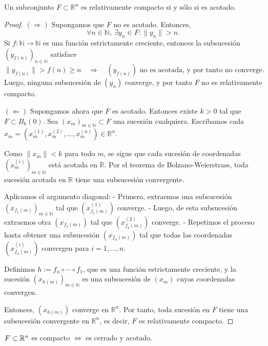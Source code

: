 \clearpage

\begin{prop}
  Un subconjunto \(F \subset \mathbb{R}^n\) es relativamente compacto si y sólo si es acotado.
  \begin{proof}
    \((\Rightarrow)\) Supongamos que \(F\) no es acotado. Entonces,
    \[
      \forall n \in \mathbb{N},\ \exists y_n \in F : \|y_n\| > n.
    \]
    Si \(f : \mathbb{N} \to \mathbb{N}\) es una función estrictamente creciente, entonces la subsucesión \((y_{f(n)})_{n \in \mathbb{N}}\) satisface
    \[
      \|y_{f(n)}\| > f(n) \geq n \quad \Rightarrow \quad (y_{f(n)}) \text{ no es acotada, y por tanto no converge}.
    \]
    Luego, ninguna subsucesión de \((y_n)\) converge, y por tanto \(F\) no es relativamente compacto.

    \medskip

    \((\Leftarrow)\) Supongamos ahora que \(F\) es acotado. Entonces existe \(k > 0\) tal que \(F \subset B_k(0)\).
    Sea \((x_m)_{m \in \mathbb{N}} \subset F\) una sucesión cualquiera.
    Escribamos cada \(x_m = (x_{m}^{(1)}, x_{m}^{(2)}, \dots, x_{m}^{(n)}) \in \mathbb{R}^n\).

    Como \(\|x_m\| < k\) para todo \(m\), se sigue que cada sucesión de coordenadas \((x_m^{(i)})_{m \in \mathbb{N}}\) está acotada en \(\mathbb{R}\).
    Por el teorema de Bolzano-Weierstrass, toda sucesión acotada en \(\mathbb{R}\) tiene una subsucesión convergente.

    Aplicamos el argumento diagonal:
    - Primero, extraemos una subsucesión \((x_{f_1(m)})_{m \in \mathbb{N}}\) tal que \((x_{f_1(m)}^{(1)})\) converge.
    - Luego, de esta subsucesión extraemos otra \((x_{f_2(m)})\) tal que \((x_{f_2(m)}^{(2)})\) converge.
    - Repetimos el proceso hasta obtener una subsucesión \((x_{f_n(m)})\) tal que todas las coordenadas \((x_{f_n(m)}^{(i)})\) convergen para \(i = 1, \dots, n\).

    Definimos \(h := f_n \circ \cdots \circ f_1\), que es una función estrictamente creciente, y la sucesión \((x_{h(m)})_{m \in \mathbb{N}}\) es una subsucesión de \((x_m)\) cuyas coordenadas convergen.

    Entonces, \((x_{h(m)})\) converge en \(\mathbb{R}^n\).
    Por tanto, toda sucesión en \(F\) tiene una subsucesión convergente en \(\mathbb{R}^n\), es decir, \(F\) es relativamente compacto.
  \end{proof}
\end{prop}

\begin{corollary}
  \(F \subset \mathbb{R}^n\) es compacto \(\iff\) es cerrado y acotado.
\end{corollary}

